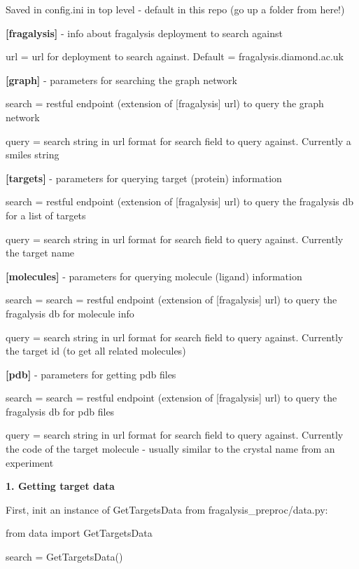 Saved in config.\+ini in top level -\/ default in this repo (go up a folder from here!)

{\bfseries \mbox{[}fragalysis\mbox{]}} -\/ info about fragalysis deployment to search against

url = url for deployment to search against. Default = fragalysis.\+diamond.\+ac.\+uk

{\bfseries \mbox{[}graph\mbox{]}} -\/ parameters for searching the graph network

search = restful endpoint (extension of \mbox{[}fragalysis\mbox{]} url) to query the graph network

query = search string in url format for search field to query against. Currently a smiles string

{\bfseries \mbox{[}targets\mbox{]}} -\/ parameters for querying target (protein) information

search = restful endpoint (extension of \mbox{[}fragalysis\mbox{]} url) to query the fragalysis db for a list of targets

query = search string in url format for search field to query against. Currently the target name

{\bfseries \mbox{[}molecules\mbox{]}} -\/ parameters for querying molecule (ligand) information

search = search = restful endpoint (extension of \mbox{[}fragalysis\mbox{]} url) to query the fragalysis db for molecule info

query = search string in url format for search field to query against. Currently the target id (to get all related molecules)

{\bfseries \mbox{[}pdb\mbox{]}} -\/ parameters for getting pdb files

search = search = restful endpoint (extension of \mbox{[}fragalysis\mbox{]} url) to query the fragalysis db for pdb files

query = search string in url format for search field to query against. Currently the code of the target molecule -\/ usually similar to the crystal name from an experiment

{\bfseries 1. Getting target data}

First, init an instance of Get\+Targets\+Data from fragalysis\+\_\+preproc/data.\+py\+:


\begin{DoxyCode}
from data import GetTargetsData

search = GetTargetsData()
\end{DoxyCode}


